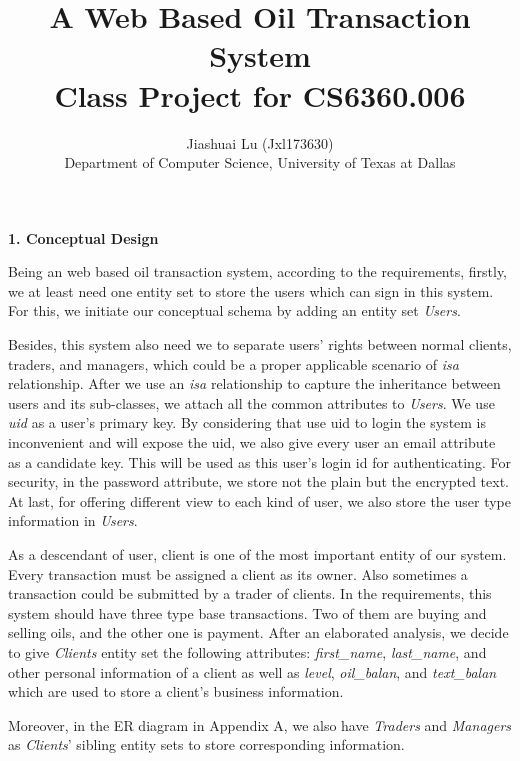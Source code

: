 \documentclass[12pt,a4paper]{report}
\begin{document}
\title{A Web Based Oil Transaction System\\
\normalsize Class Project for CS6360.006}
\author{Jiashuai Lu (Jxl173630)\\ Department of Computer Science, University of Texas at Dallas}
\maketitle
\clearpage
\begin{mypara}
  \textbf{1. Conceptual Design}
  \par
  Being an web based oil transaction system, according to the requirements, firstly, we at least need one entity set to store the users which can sign in this system. For this, we initiate our conceptual schema by adding an entity set \textit{Users}.
  \par
  Besides, this system also need we to separate users' rights between normal clients, traders, and managers, which could be a proper applicable scenario of \textit{isa} relationship. After we use an \textit{isa} relationship to capture the inheritance between users and its sub-classes, we attach all the common attributes to \textit{Users}. We use \textit{uid} as a user's primary key. By considering that use uid to login the system is inconvenient and will expose the uid, we also give every user an email attribute as a candidate key. This will be used as this user's login id for authenticating. For security, in the password attribute, we store not the plain but the encrypted text. At last, for offering different view to each kind of user, we also store the user type information in \textit{Users}.
  \par
  As a descendant of user, client is one of the most important entity of our system. Every transaction must be assigned a client as its owner. Also sometimes a transaction could be submitted by a trader of clients. In the requirements, this system should have three type base transactions. Two of them are buying and selling oils, and the other one is payment. After an elaborated analysis, we decide to give \textit{Clients} entity set the following attributes: \textit{first\_name}, \textit{last\_name}, and other personal information of a client as well as \textit{level}, \textit{oil\_balan}, and \textit{text\_balan} which are used to store a client's business information.
  \par
  Moreover, in the ER diagram in Appendix A, we also have \textit{Traders} and \textit{Managers} as \textit{Clients}' sibling entity sets to store corresponding information.


\end{mypara}
\end{document}
